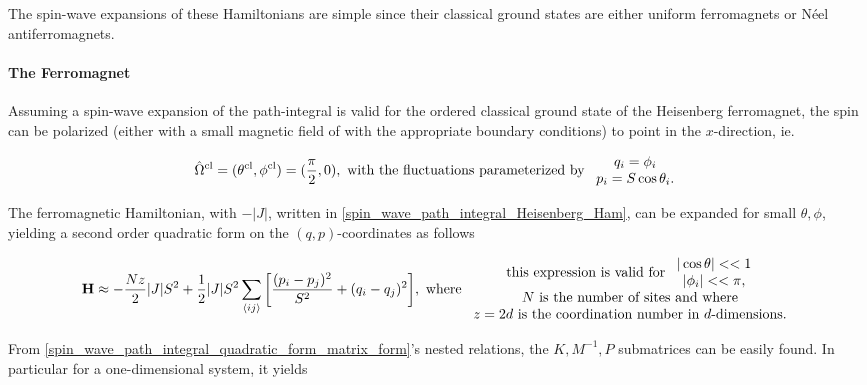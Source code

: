 The spin-wave expansions of these Hamiltonians are simple since their classical ground states are either uniform ferromagnets or Néel antiferromagnets. \\

\paragraph{The Ferromagnet}

Assuming a spin-wave expansion of the path-integral is valid for the ordered classical ground state of the Heisenberg ferromagnet, the spin can be polarized (either with a small magnetic field of with the appropriate boundary conditions) to point in the $x$-direction, ie.

\begin{equation}
    \hat{\Omega}^{\textnormal{cl}} = (\theta^{\textnormal{cl}}, \phi^{\textnormal{cl}}) = (\frac{\pi}{2}, 0), \textnormal{ with the fluctuations parameterized by } \begin{array}{cc}
        q_i = \phi_i  \\
        p_i = S \cos \theta_i.
    \end{array}
\end{equation}

The ferromagnetic Hamiltonian, with $-|J|$, written in \cref{spin_wave_path_integral_Heisenberg_Ham}, can be expanded for small $\theta, \phi$, yielding a second order quadratic form on the $(q, p)$-coordinates as follows

\begin{equation}
    {\bf H} \approx - \frac{Nz}{2} |J| S^2 + \frac{1}{2} |J| S^2 \sum_{ \langle ij \rangle } \bigg[ \frac{(p_i - p_j)^2}{S^2} + (q_i - q_j)^2\bigg], \textnormal{ where } \begin{array}{cc}
         \textnormal{ this expression is valid for } \begin{array}{cc}
              |\cos \theta| << 1  \\
              |\phi_i| << \pi,
         \end{array} \\
         \textnormal{ $N$ is the number of sites and where } \\
         \textnormal{$z = 2d$ is the coordination number in $d$-dimensions.}
    \end{array}
\end{equation}

From \cref{spin_wave_path_integral_quadratic_form_matrix_form}'s nested relations, the $K, M^{-1}, P$ submatrices can be easily found. In particular for a one-dimensional system, it yields 


